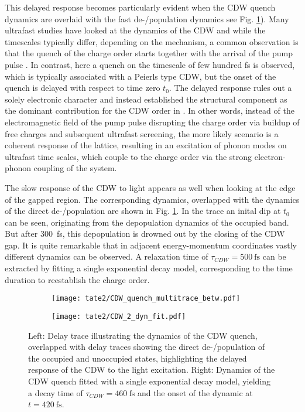 This delayed response becomes particularly evident when the CDW quench dynamics are overlaid with the fast de-/population dynamics see Fig. \ref{fig:TaTe_CDW_comp}).
Many ultrafast studies have looked at the dynamics of the CDW and while the timescales typically differ, depending on the mechanism, a common observation is that the quench of the charge order starts together with the arrival of the pump pulse \cite{perfetti_time_2006, rohwer_collapse_2011, rettig_coherent_2014, shi_ultrafast_2019, maklar_nonequilibrium_2021, maklar_coherent_2022, huber_mapping_2022, huber_revealing_2022, maklar_coherent_2023, huber_ultrafast_2024}.
In contrast, here a quench on the timescale of few hundred \unit{\femto\second} is observed, which is typically associated with a Peierls type CDW, but the onset of the quench is delayed with respect to time zero $t_0$.
The delayed response rules out a solely electronic character and instead established the structural component as the dominant contribution for the CDW order in .
In other words, instead of the electromagnetic field of the pump pulse disrupting the charge order via buildup of free charges and subsequent ultrafast screening, the more likely scenario is a coherent response of the lattice, resulting in an excitation of phonon modes on ultrafast time scales, which couple to the charge order via the strong electron-phonon coupling of the system.

The slow response of the CDW to light appears as well when looking at the edge of the gapped region.
The corresponding dynamics, overlapped with the dynamics of the direct de-/population are shown in Fig. \ref{fig:TaTe_CDW_comp}.
In the trace an inital dip at $t_0$ can be seen, originating from the depopulation dynamics of the occupied band.
But after \qty{300}{\femto\second}, this depopulation is drowned out by the closing of the CDW gap.
It is quite remarkable that in adjacent energy-momentum coordinates vastly different dynamics can be observed.
A relaxation time of $\tau_{CDW}=\qty{500}{\femto\second}$ can be extracted by fitting a single exponential decay model, corresponding to the time duration to reestablish the charge order.

\begin{figure}[t!]
	\centering
	\begin{subfigure}[b]{0.33\textwidth}
		\texttt{[image: tate2/CDW\_quench\_multitrace\_betw.pdf]}
		\caption{}
	\end{subfigure}
	\begin{subfigure}[b]{0.33\textwidth}
		\texttt{[image: tate2/CDW\_2\_dyn\_fit.pdf]}
		\caption{}
	\end{subfigure}
	\caption{Left: Delay trace illustrating the dynamics of the CDW quench, overlapped with delay traces showing the direct de-/population of the occupied and unoccupied states, highlighting the delayed response of the CDW to the light excitation. Right: Dynamics of the CDW quench fitted with a single exponential decay model, yielding a decay time of $\tau_{CDW}=\qty{460}{\femto\second}$ and the onset of the dynamic at $t=\qty{420}{\femto\second}$.}
	\label{fig:TaTe_CDW_comp}
\end{figure}

